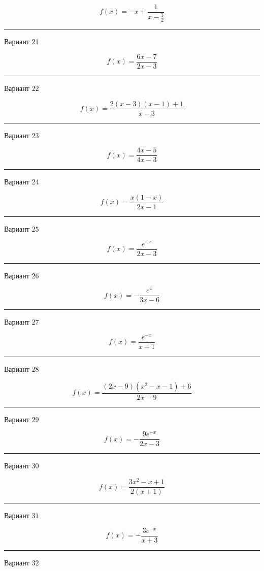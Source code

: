 \documentclass[11pt]{report}
\begin{document}
$$f(x) = - x + \frac{1}{x - \frac{3}{2}}$$
\begin{center}
\noindent\rule{8cm}{0.4pt}
\end{center}
Вариант $21$


$$f(x) = \frac{6 x - 7}{2 x - 3}$$
\begin{center}
\noindent\rule{8cm}{0.4pt}
\end{center}
Вариант $22$


$$f(x) = \frac{2 \left(x - 3\right) \left(x - 1\right) + 1}{x - 3}$$
\begin{center}
\noindent\rule{8cm}{0.4pt}
\end{center}
Вариант $23$


$$f(x) = \frac{4 x - 5}{4 x - 3}$$
\begin{center}
\noindent\rule{8cm}{0.4pt}
\end{center}
Вариант $24$


$$f(x) = \frac{x \left(1 - x\right)}{2 x - 1}$$
\begin{center}
\noindent\rule{8cm}{0.4pt}
\end{center}
Вариант $25$


$$f(x) = \frac{e^{- x}}{2 x - 3}$$
\begin{center}
\noindent\rule{8cm}{0.4pt}
\end{center}
Вариант $26$


$$f(x) = - \frac{e^{x}}{3 x - 6}$$
\begin{center}
\noindent\rule{8cm}{0.4pt}
\end{center}
Вариант $27$


$$f(x) = \frac{e^{- x}}{x + 1}$$
\begin{center}
\noindent\rule{8cm}{0.4pt}
\end{center}
Вариант $28$


$$f(x) = \frac{\left(2 x - 9\right) \left(x^{2} - x - 1\right) + 6}{2 x - 9}$$
\begin{center}
\noindent\rule{8cm}{0.4pt}
\end{center}
Вариант $29$


$$f(x) = - \frac{9 e^{- x}}{2 x - 3}$$
\begin{center}
\noindent\rule{8cm}{0.4pt}
\end{center}
Вариант $30$


$$f(x) = \frac{3 x^{2} - x + 1}{2 \left(x + 1\right)}$$
\begin{center}
\noindent\rule{8cm}{0.4pt}
\end{center}
Вариант $31$


$$f(x) = - \frac{3 e^{- x}}{x + 3}$$
\begin{center}
\noindent\rule{8cm}{0.4pt}
\end{center}
Вариант $32$
\end{document}
